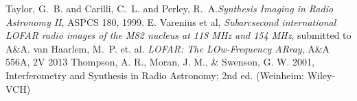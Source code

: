 \documentclass[twoside]{report}
\begin{document}



\begin{thebibliography}{1}
 {Taylor}, G.~B. and {Carilli}, C.~L. and {Perley}, R.~A.{\em Synthesis Imaging in Radio Astronomy II}, ASPCS 180, 1999.
 E. Varenius et al, {\em Subarcsecond international LOFAR radio images of the M82 nucleus at 118 MHz and 154 MHz}, submitted to A\&A.
 {van Haarlem}, M.~P.  et. al. {\em LOFAR: The LOw-Frequency ARray}, A\&A 556A, 2V 2013
 Thompson, A. R., Moran, J. M., \& Swenson, G. W. 2001, Interferometry and Synthesis in Radio Astronomy; 2nd ed. (Weinheim: Wiley-VCH)
\end{thebibliography}
\end{document}

